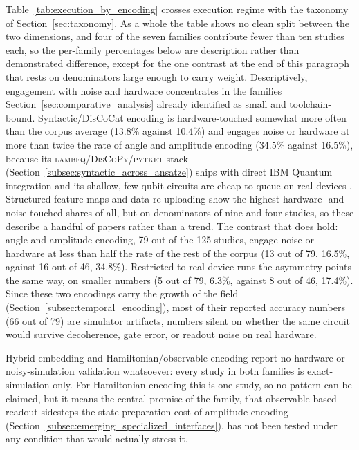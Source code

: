 \documentclass{ieeeaccess}
\begin{document}
Table~\ref{tab:execution_by_encoding} crosses execution regime with the taxonomy of Section~\ref{sec:taxonomy}. As a whole the table shows no clean split between the two dimensions, and four of the seven families contribute fewer than ten studies each, so the per-family percentages below are description rather than demonstrated difference, except for the one contrast at the end of this paragraph that rests on denominators large enough to carry weight. Descriptively, engagement with noise and hardware concentrates in the families Section~\ref{sec:comparative_analysis} already identified as small and toolchain-bound. Syntactic/DisCoCat encoding is hardware-touched somewhat more often than the corpus average (13.8\% against 10.4\%) and engages noise or hardware at more than twice the rate of angle and amplitude encoding (34.5\% against 16.5\%), because its \textsc{lambeq}/\textsc{DisCoPy}/\textsc{pytket} stack (Section~\ref{subsec:syntactic_across_ansatze}) ships with direct IBM Quantum integration and its shallow, few-qubit circuits are cheap to queue on real devices \cite{lorenz_qnlp_2023,meichanetzidis_grammar-aware_2023,peral-garcia_comparing_2024,miranda_quantum_2022}. Structured feature maps and data re-uploading show the highest hardware- and noise-touched shares of all, but on denominators of nine and four studies, so these describe a handful of papers rather than a trend. The contrast that does hold: angle and amplitude encoding, 79 out of the 125 studies, engage noise or hardware at less than half the rate of the rest of the corpus (13 out of 79, 16.5\%, against 16 out of 46, 34.8\%). Restricted to real-device runs the asymmetry points the same way, on smaller numbers (5 out of 79, 6.3\%, against 8 out of 46, 17.4\%). Since these two encodings carry the growth of the field (Section~\ref{subsec:temporal_encoding}), most of their reported accuracy numbers (66 out of 79) are simulator artifacts, numbers silent on whether the same circuit would survive decoherence, gate error, or readout noise on real hardware.

Hybrid embedding and Hamiltonian/observable encoding report no hardware or noisy-simulation validation whatsoever: every study in both families is exact-simulation only. For Hamiltonian encoding this is one study, so no pattern can be claimed, but it means the central promise of the family, that observable-based readout sidesteps the state-preparation cost of amplitude encoding (Section~\ref{subsec:emerging_specialized_interfaces}), has not been tested under any condition that would actually stress it.
\end{document}
